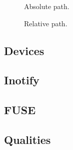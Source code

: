 \begin{figure}[tbp]
  \begin{center}
  \end{center}
  \caption{Absolute path.}
  \label{fig:topics:fs:path:abs}
\end{figure}


\begin{figure}[tbp]
  \begin{center}
  \end{center}
  \caption{Relative path.}
  \label{fig:topics:fs:path:rel}
\end{figure}


\subsection{Devices}



\subsection{Inotify}



\subsection{FUSE}

\subsection{Qualities}


